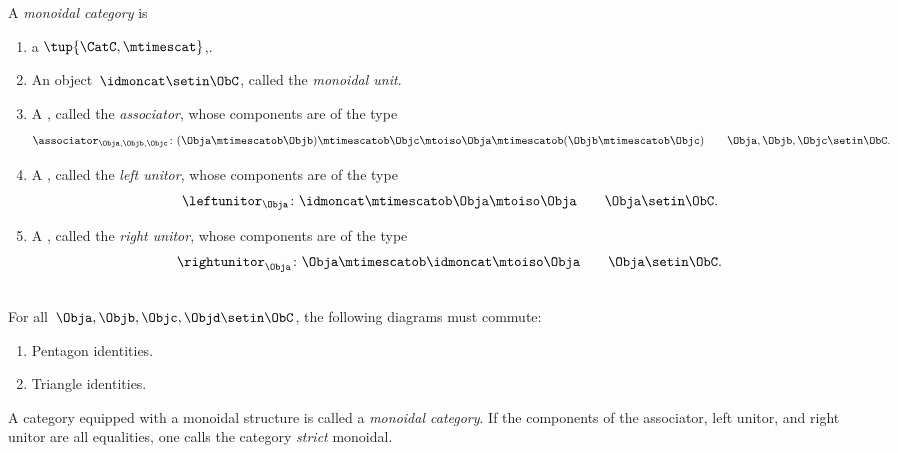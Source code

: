 %

\begin{ctdefinition}
    \label{def:monoidal-cat}
    A \emph{monoidal category} is

    \constit
    \begin{enumerate}
        \item a  $\tup{\CatC, \mtimescat}$,.
        \item An object~$\idmoncat \setin \ObC$, called the \emph{monoidal unit}.
        \item A , called the \emph{associator}, whose components are of the type
              \begin{equation}
                  \associator_{\Obja,\Objb,\Objc}\colon (\Obja \mtimescatob \Objb )\mtimescatob \Objc \mtoiso \Obja\mtimescatob (\Objb \mtimescatob \Objc) \quad \quad \Obja,\Objb,\Objc\setin \ObC.
              \end{equation}
        \item A , called the \emph{left unitor}, whose components are of the type
              \begin{equation}
                  \leftunitor_\Obja \colon \idmoncat\mtimescatob \Obja \mtoiso \Obja \quad \quad \Obja\setin \ObC.
              \end{equation}
        \item A , called the \emph{right unitor}, whose components are of the type
              \begin{equation}
                  \rightunitor_\Obja \colon \Obja \mtimescatob \idmoncat \mtoiso \Obja \quad \quad \Obja\setin \ObC.
              \end{equation}
    \end{enumerate}

    \condit\\
    For all~$\Obja,\Objb,\Objc,\Objd\setin \ObC$, the following diagrams must commute:
    \begin{enumerate}
        \item Pentagon identities.
        \item Triangle identities.
    \end{enumerate}

    A category equipped with a monoidal structure is called a \emph{monoidal category}.
    If the components of the associator, left unitor, and right unitor are all equalities, one calls the category \emph{strict} monoidal.
\end{ctdefinition}

